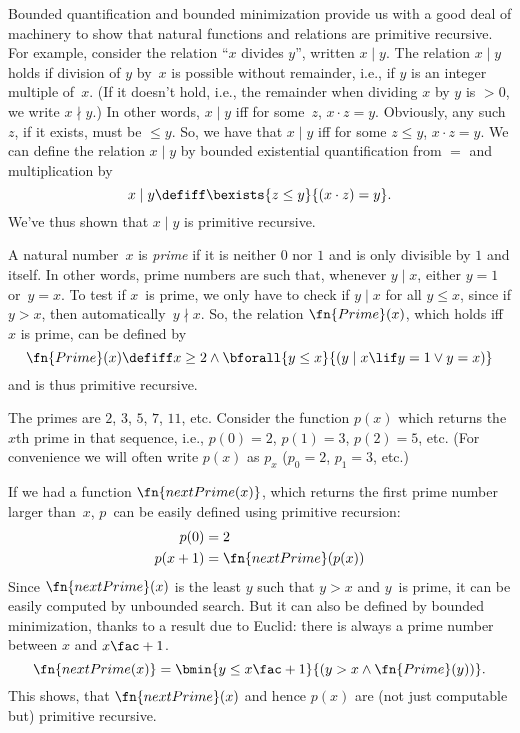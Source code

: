 \documentclass[../../../include/open-logic-section]{subfiles}
\begin{document}

Bounded quantification and bounded minimization provide us with a good
deal of machinery to show that natural functions and relations are
primitive recursive. For example, consider the relation ``$x$
divides $y$'', written $x \mid y$.  The relation $x \mid y$ holds if
division of $y$ by~$x$ is possible without remainder, i.e., if $y$ is
an integer multiple of~$x$.  (If it doesn't hold, i.e., the remainder
when dividing $x$ by $y$ is $> 0$, we write $x \nmid y$.) In other
words, $x \mid y$ iff for some~$z$, $x \cdot z = y$.  Obviously, any
such $z$, if it exists, must be $\leq y$. So, we have that $x \mid y$
iff for some $z \le y$, $x \cdot z = y$.  We can define the relation
$x \mid y$ by bounded existential quantification from $=$ and
multiplication by
\[
x \mid y \defiff \bexists{z \leq y}{(x \cdot z) = y}.
\]
We've thus shown that $x \mid y$ is primitive recursive.

A natural number~$x$ is \emph{prime} if it is neither $0$ nor $1$ and
is only divisible by $1$ and itself. In other words, prime numbers are
such that, whenever $y \mid x$, either $y = 1$ or~$y=x$.  To test if
$x$~is prime, we only have to check if $y \mid x$ for all $y \le x$,
since if $y > x$, then automatically~$y \nmid x$.  So, the relation
$\fn{Prime}(x)$, which holds iff $x$ is prime, can be defined by
\[
\fn{Prime}(x) \defiff x \geq 2 \land \bforall{y \leq x}{(y \mid x \lif y
  = 1 \lor y = x)}
\]
and is thus primitive recursive.

The primes are $2$, $3$, $5$, $7$, $11$, etc. Consider the function
$p(x)$ which returns the $x$th prime in that sequence, i.e., $p(0) =
2$, $p(1) = 3$, $p(2) = 5$, etc. (For convenience we will often write
$p(x)$ as $p_x$ ($p_0=2$, $p_1=3$, etc.)

If we had a function
$\fn{nextPrime(x)}$, which returns the first prime number larger
than~$x$, $p$~can be easily defined using primitive recursion:
\begin{align*}
  p(0) & = 2\\
  p(x+1) & = \fn{nextPrime}(p(x))
\end{align*}
Since $\fn{nextPrime}(x)$ is the least $y$ such that $y > x$ and
$y$~is prime, it can be easily computed by unbounded search. But it
can also be defined by bounded minimization, thanks to a result due to
Euclid: there is always a prime number between $x$ and $x\fac+1$.
\[
  \fn{nextPrime(x)} =
  \bmin{y \leq x\fac+1}{(y > x \land \fn{Prime}(y))}.
\]
This shows, that $\fn{nextPrime}(x)$ and hence $p(x)$ are (not just
computable but) primitive recursive.
\end{document}
